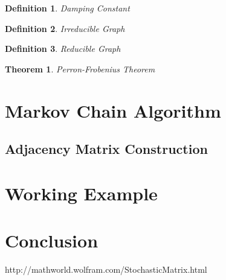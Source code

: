 \documentclass{article}
\newtheorem{theorem}{Theorem}
\newtheorem{definition}{Definition}
\begin{document}
    \begin{definition}{Damping Constant}

    \end{definition}
    
    \begin{definition}{Irreducible Graph}

    \end{definition}
    
    \begin{definition}{Reducible Graph}

    \end{definition}
    
    \begin{theorem}{Perron-Frobenius Theorem}
    
    \end{theorem}
\section{Markov Chain Algorithm}

\subsection{Adjacency Matrix Construction}

\section{Working Example}

\section{Conclusion}



http://mathworld.wolfram.com/StochasticMatrix.html
\end{document}
